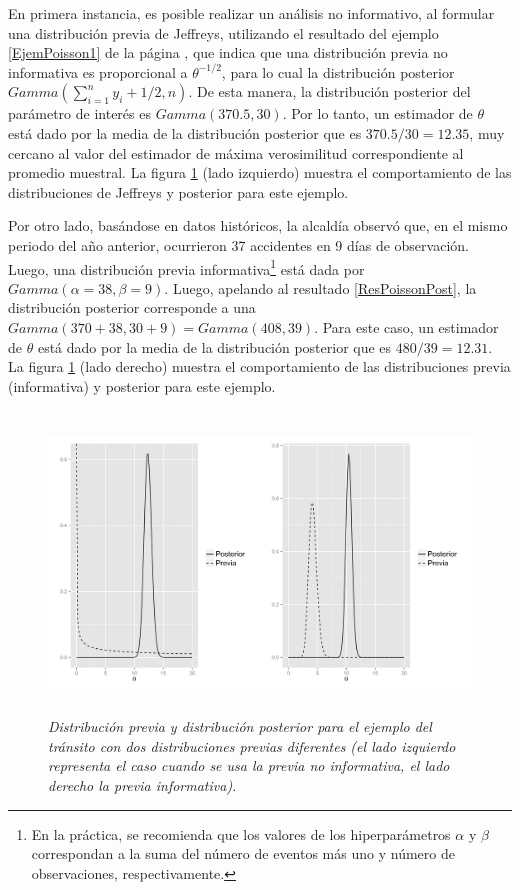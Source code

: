 \documentclass[10pt,openright]{book}\usepackage[]{graphicx}\usepackage[]{color}
\begin{document}
\begin{Eje}
    En primera instancia, es posible realizar un an\'alisis no informativo, al formular una distribuci\'on previa de Jeffreys, utilizando el resultado del ejemplo \ref{EjemPoisson1} de la p\'agina \pageref{EjemPoisson1}, que indica que una distribuci\'on previa no informativa es proporcional a $\theta^{-1/2}$, para lo cual la distribuci\'on posterior $Gamma(\sum_{i=1}^n y_i+1/2, n)$. De esta manera, la distribuci\'on posterior del par\'ametro de inter\'es es $Gamma(370.5, 30)$. Por lo tanto, un estimador de $\theta$ est\'a dado por la media de la distribuci\'on posterior que es $370.5/30=12.35$, muy cercano al valor del estimador de m\'axima verosimilitud correspondiente al promedio muestral. La figura \ref{EjemPoisson2} (lado izquierdo) muestra el comportamiento de las distribuciones de Jeffreys y posterior para este ejemplo.
    
    Por otro lado, bas\'andose en datos hist\'oricos, la alcald\'ia observ\'o que, en el mismo periodo del a\~no anterior, ocurrieron 37 accidentes en 9 d\'ias de observaci\'on. Luego, una distribuci\'on previa informativa\footnote{En la pr\'actica, se recomienda que los valores de los hiperpar\'ametros $\alpha$ y $\beta$ correspondan a la suma del n\'umero de eventos m\'as uno y n\'umero de observaciones, respectivamente.} est\'a dada por $Gamma(\alpha=38,\beta=9)$. Luego, apelando al resultado \ref{ResPoissonPost}, la distribuci\'on posterior corresponde a una $Gamma(370+38, 30+9)=Gamma(408, 39)$. Para este caso, un estimador de $\theta$ est\'a dado por la media de la distribuci\'on posterior que es $480/39=12.31$. La figura \ref{EjemPoisson2} (lado derecho) muestra el comportamiento de las distribuciones previa (informativa) y posterior para este ejemplo.
    
    \begin{figure}[!h]
    \centering
    \includegraphics[width=18cm,height=8cm]{EjemPoisson2.pdf}
    \caption{\emph{Distribuci\'on previa y distribuci\'on posterior para el ejemplo del tr\'ansito con dos distribuciones previas diferentes (el lado izquierdo representa el caso cuando se usa la previa no informativa, el lado derecho la previa informativa).}}
    \label{EjemPoisson2}
    \end{figure}
    

\end{Eje}
\end{document}

